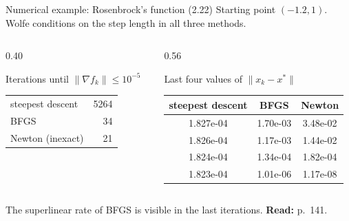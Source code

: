 \documentclass[aspectratio=169,12pt]{beamer}
\newcommand{\xs}{x^{*}}
\newcommand{\gradf}{\nabla f}
\newcommand{\readbook}[1]{{\color{red}\textbf{Read:} #1}}
\begin{document}
\begin{frame}{Numerical example: Rosenbrock's function (2.22)}
  Starting point $(-1.2,1)$. Wolfe conditions on the step length in all three methods.

  \vspace{0.3em}
  \begin{columns}[T,onlytextwidth]
    \begin{column}{0.40\textwidth}
      \begin{center}
      Iterations until $\|\gradf_{k}\|\le 10^{-5}$\\[0.4em]
      \begin{tabular}{lr}
        \toprule
        steepest descent & 5264 \\
        BFGS & 34 \\
        Newton (inexact) & 21 \\
        \bottomrule
      \end{tabular}
      \end{center}
    \end{column}
    \begin{column}{0.56\textwidth}
      \begin{center}
      Last four values of $\|x_{k}-\xs\|$\\[0.4em]
      \begin{tabular}{ccc}
        \toprule
        steepest descent & BFGS & Newton \\
        \midrule
        1.827e-04 & 1.70e-03 & 3.48e-02 \\
        1.826e-04 & 1.17e-03 & 1.44e-02 \\
        1.824e-04 & 1.34e-04 & 1.82e-04 \\
        1.823e-04 & 1.01e-06 & 1.17e-08 \\
        \bottomrule
      \end{tabular}
      \end{center}
    \end{column}
  \end{columns}

  \vspace{0.7em}
  The superlinear rate of BFGS is visible in the last iterations.
  \readbook{p.~141.}
\end{frame}
\end{document}
